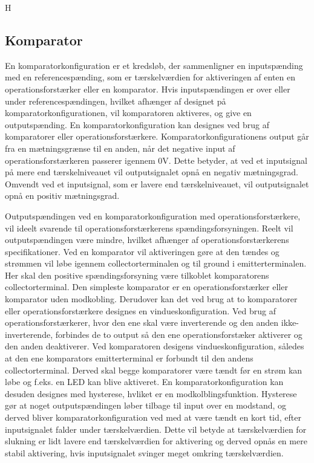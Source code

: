 H%
\subsection{Komparator}\label{Komparatorafsnit}
En komparatorkonfiguration er et kredsløb, der sammenligner en inputspænding  med en referencespænding, som er tærskelværdien for aktiveringen af enten en operationsforstærker eller en komparator. %
Hvis inputspændingen er over eller under referencespændingen, hvilket afhænger af designet på komparatorkonfigurationen, vil komparatoren aktiveres, og give en outputspænding. En komparatorkonfiguration kan designes ved brug af komparatorer eller operationsforstærkere.
Komparatorkonfigurationens output går fra en mætningsgrænse til en anden, når det negative input af operationsforstærkeren passerer igennem $0$V. Dette betyder, at ved et inputsignal på mere end tærskelniveauet vil outputsignalet opnå en negativ mætningsgrad. Omvendt ved et inputsignal, som er lavere end tærskelniveauet, vil outputsignalet opnå en positiv mætningsgrad. \cite{webster2009} 

Outputspændingen ved en komparatorkonfiguration med operationsforstærkere, vil ideelt svarende til operationsforstærkerens spændingsforsyningen. Reelt vil outputspændingen være mindre, hvilket afhænger af operationsforstærkerens specifikationer. Ved en komparator vil aktiveringen gøre at den tændes og strømmen vil løbe igennem collectorterminalen og til ground i emitterterminalen. Her skal den positive spændingsforsyning være tilkoblet komparatorens collectorterminal. Den simpleste komparator er en operationsforstærker eller komparator uden modkobling. Derudover kan det ved brug at to komparatorer eller operationsforstærkere designes en vindueskonfiguration. Ved brug af operationsforstærkerer, hvor den ene skal være inverterende og den anden ikke-inverterende,  forbindes de to output så den ene operationsforstæker aktiverer og den anden deaktiverer. Ved komparatoren desigens vindueskonfiguration, således at den ene komparators emitterterminal er forbundt til den andens collectorterminal. Derved skal begge komparatorer være tændt før en strøm kan løbe og f.eks. en LED kan blive aktiveret. En komparatorkonfiguration kan desuden designes med hysterese, hvliket er en modkolblingsfunktion. Hysterese gør at noget outputspændingen løber tilbage til input over en modstand, og derved bliver komparatorkonfiguration ved med at være tændt en kort tid, efter inputsignalet falder under tærskelværdien. Dette vil betyde at tærskelværdien for slukning er lidt lavere end tærskelværdien for aktivering og derved opnås en mere stabil aktivering, hvis inputsignalet svinger meget omkring tærskelværdien. \cite{webster2009, Storr2015} \\
  


